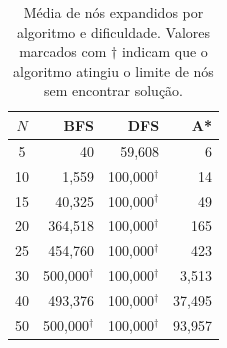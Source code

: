 \begin{table}[htbp]
\centering
\caption{Média de nós expandidos por algoritmo e dificuldade. Valores marcados com $\dagger$ indicam que o algoritmo atingiu o limite de nós sem encontrar solução.}
\label{tab:nodes}
\begin{tabular}{crrr}
\toprule
$N$ & BFS & DFS & A* \\
\midrule
5 & 40 & 59,608 & 6 \\
10 & 1,559 & 100,000$^\dagger$ & 14 \\
15 & 40,325 & 100,000$^\dagger$ & 49 \\
20 & 364,518 & 100,000$^\dagger$ & 165 \\
25 & 454,760 & 100,000$^\dagger$ & 423 \\
30 & 500,000$^\dagger$ & 100,000$^\dagger$ & 3,513 \\
40 & 493,376 & 100,000$^\dagger$ & 37,495 \\
50 & 500,000$^\dagger$ & 100,000$^\dagger$ & 93,957 \\
\bottomrule
\end{tabular}
\end{table}
